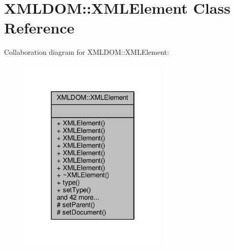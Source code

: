 \hypertarget{classXMLDOM_1_1XMLElement}{}\section{X\+M\+L\+D\+OM\+:\+:X\+M\+L\+Element Class Reference}
\label{classXMLDOM_1_1XMLElement}


Collaboration diagram for X\+M\+L\+D\+OM\+:\+:X\+M\+L\+Element\+:
\nopagebreak
\begin{figure}[H]
\begin{center}
\leavevmode
\includegraphics[width=202pt]{db/d67/classXMLDOM_1_1XMLElement__coll__graph}
\end{center}
\end{figure}
